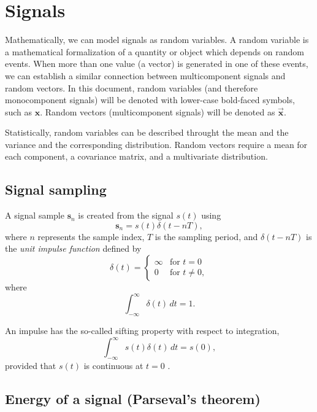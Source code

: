 \chapter{Signals}

Mathematically, we can model signals as random variables. A random
variable is a mathematical formalization of a quantity or object which
depends on random events. When more than one value (a vector) is
generated in one of these events, we can establish a similar
connection between multicomponent signals and random vectors. In this
document, random variables (and therefore monocomponent signals) will
be denoted with lower-case bold-faced symbols, such as
$\mathbf{x}$. Random vectors (multicomponent signals) will be denoted
as $\overrightarrow{\mathbf{x}}$.

Statistically, random variables can be described throught the mean and
the variance and the corresponding distribution. Random vectors
require a mean for each component, a covariance matrix, and a
multivariate distribution.

\section{Signal sampling}

A signal sample $\mathbf{s}_n$ is created from the signal $s(t)$ using
\begin{equation}
  \mathbf{s}_n = s(t)\delta(t-nT),
\end{equation}
where $n$ represents the sample index, $T$ is the sampling period, and
$\delta(t-nT)$ is the \emph{unit impulse function} defined by
\begin{equation}
\delta(t) =
\begin{cases}
\infty & \text{for } t = 0 \\
0 & \text{for } t \neq 0,
\end{cases}
\end{equation}
where
\begin{equation}
\int_{-\infty}^{\infty} \delta(t) \, dt = 1.
\end{equation}

An impulse has the so-called sifting
property with respect to integration,
\begin{equation}
\int_{-\infty}^{\infty} s(t)\delta(t) \, dt = s(0),
\end{equation}
provided that $s(t)$ is continuous at $t=0$ \cite{gonzalez1992digital}.


\section{Energy of a signal (Parseval's theorem)}
\label{sec:energy_signal}

